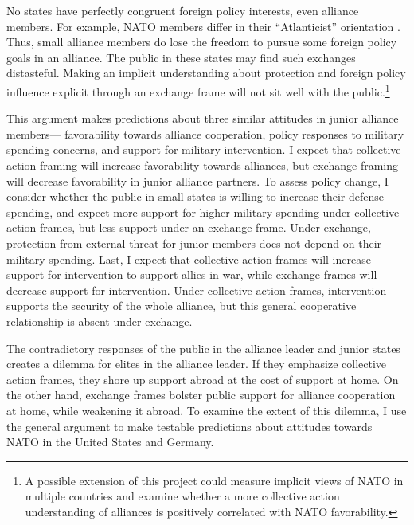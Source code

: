 \documentclass[12pt]{article}
\begin{document}
No states have perfectly congruent foreign policy interests, even alliance members. 
For example, NATO members differ in their ``Atlanticist'' orientation \citep{BeckerMalesky2017}. 
Thus, small alliance members do lose the freedom to pursue some foreign policy goals in an alliance. 
The public in these states may find such exchanges distasteful. 
Making an implicit understanding about protection and foreign policy influence explicit through an exchange frame will not sit well with the public.\footnote{A possible extension of this project could measure implicit views of NATO in multiple countries and examine whether a more collective action understanding of alliances is positively correlated with NATO favorability.}


This argument makes predictions about three similar attitudes in junior alliance members--- favorability towards alliance cooperation, policy responses to military spending concerns, and support for military intervention. 
I expect that collective action framing will increase favorability towards alliances, but exchange framing will decrease favorability in junior alliance partners. 
To assess policy change, I consider whether the public in small states is willing to increase their defense spending, and expect more support for higher military spending under collective action frames, but less support under an exchange frame.
Under exchange, protection from external threat for junior members does not depend on their military spending. 
Last, I expect that collective action frames will increase support for intervention to support allies in war, while exchange frames will decrease support for intervention. 
Under collective action frames, intervention supports the security of the whole alliance, but this general cooperative relationship is absent under exchange. 


The contradictory responses of the public in the alliance leader and junior states creates a dilemma for elites in the alliance leader. 
If they emphasize collective action frames, they shore up support abroad at the cost of support at home. 
On the other hand, exchange frames bolster public support for alliance cooperation at home, while weakening it abroad. 
To examine the extent of this dilemma, I use the general argument to make testable predictions about attitudes towards NATO in the United States and Germany. 
\end{document}
